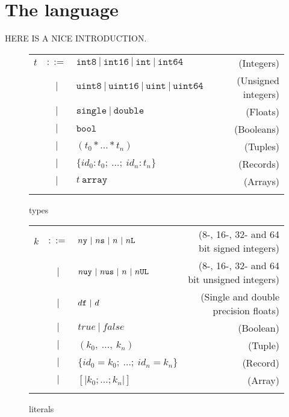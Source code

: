 \chapter{The \fshark{} language}
\label{chap:fsharklanguage}

HERE IS A NICE INTRODUCTION.

\begin{figure}
  \centering
  \begin{tabular}{@{}lclr}
    $t$ & $::=$ & $\texttt{int8}~|~\texttt{int16} ~|~ \texttt{int} ~ |~\texttt{int64} $ & (Integers) \\
        & $|$   & $\texttt{uint8} ~ | ~\texttt{uint16} ~|~\texttt{uint} ~|~\texttt{uint64} $ & (Unsigned integers) \\
        & $|$   & $\texttt{single} ~| ~\texttt{double}$ & (Floats) \\
        & $|$   & $\texttt{bool}$ & (Booleans) \\
        & $|$   & $(t_0 * \ldots * t_n)$ & (Tuples) \\
        & $|$   & $\{id_0:t_0;~\ldots;~id_n:t_n\}$ & (Records) \\
        & $|$   & $t~\mathtt{array}$& (Arrays) \\
    \\
  \end{tabular}
  \caption{\fshark{} types}
\end{figure}

\begin{figure}
  \centering
  \begin{tabular}{@{}lclr}
    $k$ & $::=$ & $n\lit{y}~|~n\lit{s}~|~n~|~n\lit{L}$ & (8-, 16-, 32- and 64 bit signed integers) \\
        & $|$   & $n\lit{uy}~|~n\lit{us}~|~n~|~n\lit{UL}$ & (8-, 16-, 32- and 64 bit unsigned integers) \\
        & $|$   & $d\text{\ttfamily f}~|~d $ & (Single and double precision floats) \\
        & $|$   & $true~|~false$ & (Boolean) \\
        & $|$   & $(k_0 ,~\ldots ,~k_n)$ & (Tuple) \\
        & $|$   & $\{id_0=k_0;~\ldots;~id_n=k_n\}$ & (Record) \\
        & $|$   & $[\vert k_0 ; \ldots ; k_n\vert]$ & (Array) \\
    \\
  \end{tabular}
  \caption{\fshark{} literals}
\end{figure}

